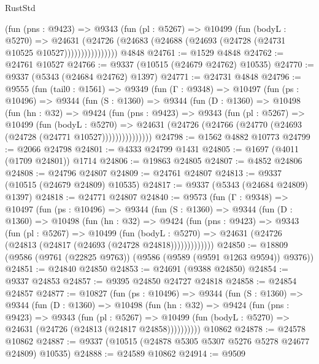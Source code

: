 \begin{lexlean}{RustStd}
\begin{coremodule}
                  (fun (pns : @9423) =>
                  @9343
                    (fun (pl : @5267) =>
                    @10499
                      (fun (bodyL : @5270) =>
                      @24631
                        (@24726
                          (@24683 (@24688 (@24693 (@24728 (@24731 @10525 @10527))))))))))))))))
    @4848
@24761 := @1529 @4848
@24762 := @24761 @10527
@24766 := @9337 (@10515 (@24679 @24762) @10535)
@24770 := @9337 (@5343 (@24684 @24762) @1397)
@24771 := @24731 @4848
@24796 := @9555
    (fun (tail0 : @1561) =>
    @9349
      (fun (Γ : @9348) =>
      @10497
        (fun (ps : @10496) =>
        @9344
          (fun (S : @1360) =>
          @9344
            (fun (D : @1360) =>
            @10498
              (fun (hn : @32) =>
              @9424
                (fun (pns : @9423) =>
                @9343
                  (fun (pl : @5267) =>
                  @10499
                    (fun (bodyL : @5270) =>
                    @24631 (@24726 (@24766 (@24770 (@24693 (@24728 (@24771 @10527)))))))))))))))
@24798 := @1562 @4882 @10773
@24799 := @2066 @24798
@24801 := @4333 @24799 @1431
@24805 := @1697 (@4011 (@1709 @24801)) @1714
@24806 := @19863 @24805
@24807 := @4852 @24806
@24808 := @24796 @24807
@24809 := @24761 @24807
@24813 := @9337 (@10515 (@24679 @24809) @10535)
@24817 := @9337 (@5343 (@24684 @24809) @1397)
@24818 := @24771 @24807
@24840 := @9573
    (fun (Γ : @9348) =>
    @10497
      (fun (ps : @10496) =>
      @9344
        (fun (S : @1360) =>
        @9344
          (fun (D : @1360) =>
          @10498
            (fun (hn : @32) =>
            @9424
              (fun (pns : @9423) =>
              @9343
                (fun (pl : @5267) =>
                @10499
                  (fun (bodyL : @5270) =>
                  @24631 (@24726 (@24813 (@24817 (@24693 (@24728 @24818)))))))))))))
@24850 := @18809 (@9586 (@9761 (@22825 @9763)) (@9586 (@9589 (@9591 @1263 @9594)) @9376))
@24851 := @24840 @24850
@24853 := @24691 (@9388 @24850)
@24854 := @9337 @24853
@24857 := @9395 @24850 @24727 @24818
@24858 := @24854 @24857
@24877 := @10827
    (fun (ps : @10496) =>
    @9344
      (fun (S : @1360) =>
      @9344
        (fun (D : @1360) =>
        @10498
          (fun (hn : @32) =>
          @9424
            (fun (pns : @9423) =>
            @9343
              (fun (pl : @5267) =>
              @10499 (fun (bodyL : @5270) => @24631 (@24726 (@24813 (@24817 @24858))))))))))
    @10862
@24878 := @24578 @10862
@24887 := @9337 (@10515 (@24878 @5305 @5307 @5276 @5278 @24677 @24809) @10535)
@24888 := @24589 @10862
@24914 := @9509

\end{coremodule}
\end{lexlean}
